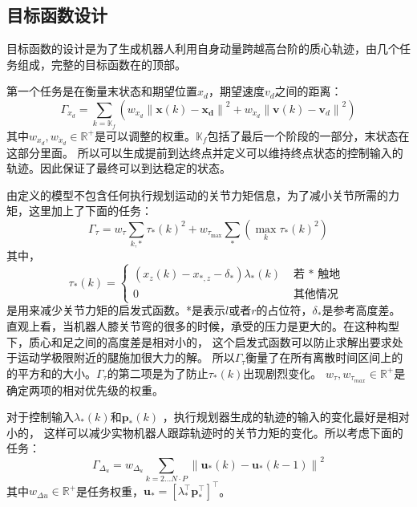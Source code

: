 \subsection{目标函数设计}
\label{cost_function}
目标函数的设计是为了生成机器人利用自身动量跨越高台阶的质心轨迹，由几个任务组成，完整的目标函数在的顶部。

第一个任务是在衡量末状态和期望位置${x}_d$，期望速度${v}_d$之间的距离：
\begin{equation}
    \label{equ:cost_1}
    \Gamma_{x_d}=\sum_{k=\mathbb{K}_f}\left(w_{x_d}\left\|\boldsymbol{x}(k)-\boldsymbol{x}_{\boldsymbol{d}}\right\|^2+w_{\dot{x}_d}\left\|\boldsymbol{v}(k)-\boldsymbol{v}_d\right\|^2\right)
\end{equation}
其中$w_{x_d}, w_{\dot{x}_d} \in \mathbb{R}^{+}$是可以调整的权重。$\mathbb{K}_f$包括了最后一个阶段的一部分，末状态在这部分里面。
所以可以生成提前到达终点并定义可以维持终点状态的控制输入的轨迹。因此保证了最终可以到达稳定的状态。

由定义的模型不包含任何执行规划运动的关节力矩信息，为了减小关节所需的力矩，这里加上了下面的任务：
\begin{equation}
    \label{equ:cost_2}
    \Gamma_\tau=w_\tau \sum_{k, *} \tau_*(k)^2+w_{\tau_{\max }} \sum_*\left(\max _k \tau_*(k)^2\right)
\end{equation}
其中，
\begin{equation}
    \label{equ:tau}
    \tau_*(k)= \begin{cases}\left(x_z(k)-x_{*, z}-\delta_*\right) \lambda_*(k) & \text { 若 } * \text { 触地 } \\ 0 & \text { 其他情况 }\end{cases}
\end{equation}
是用来减少关节力矩的启发式函数。*是表示$l$或者$r$的占位符，$\delta_*$是参考高度差。
直观上看，当机器人膝关节弯的很多的时候，承受的压力是更大的。在这种构型下，质心和足之间的高度差是相对小的，
这个启发式函数可以防止求解出要求处于运动学极限附近的腿施加很大力的解。
所以$\Gamma_\tau$衡量了在所有离散时间区间上的的平方和的大小。$\Gamma_\tau$的第二项是为了防止$\tau_*(k)$出现剧烈变化。
$w_{\tau}, w_{\tau_{max}} \in \mathbb{R}^+$是确定两项的相对优先级的权重。

对于控制输入$\lambda_*(k)$和$\boldsymbol{p}_*(k)$ ，执行规划器生成的轨迹的输入的变化最好是相对小的，
这样可以减少实物机器人跟踪轨迹时的关节力矩的变化。所以考虑下面的任务：
\begin{equation}
    \label{equ:cost_3}
    \Gamma_{\Delta_u}=w_{\Delta_u} \sum_{k=2 \ldots N \cdot P}\left\|\boldsymbol{u}_*(k)-\boldsymbol{u}_*(k-1)\right\|^2
\end{equation}
其中$w_{\Delta u} \in \mathbb{R}^+$是任务权重，$\boldsymbol{u}_*=\left[\lambda_*^{\top} \boldsymbol{p}_*^{\top}\right]^{\top}$。

